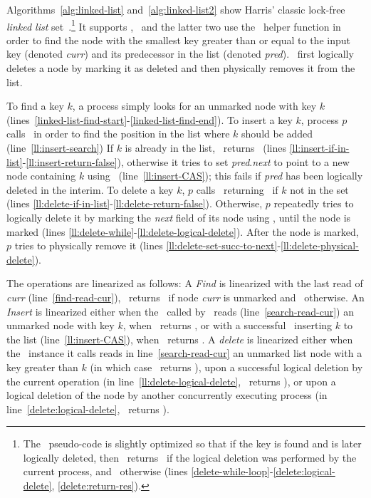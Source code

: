Algorithms~\ref{alg:linked-list} and~\ref{alg:linked-list2} show
Harris' classic lock-free \emph{linked list}
set~\cite{DBLP:conf/wdag/Harris01}.\footnote{
    The \delete\ pseudo-code is slightly optimized so that if the key is found and
    is later logically deleted, then \delete\ returns \True\ if the logical deletion
    was performed by the current process, and \False\ otherwise
    (lines \ref{delete-while-loop}-\ref{delete:logical-delete}, \ref{delete:return-res}).}
It supports \find, \insertlst\ and \delete\;
the latter two use the \search\ helper function in order to find the node with
the smallest key greater than or equal to the input key (denoted \emph{curr})
and its predecessor in the list (denoted \emph{pred}).
\delete\ first logically deletes a node by marking it
as deleted and then physically removes it from the list.



To find a key $k$, a process simply looks for an unmarked node with key $k$
(lines~\ref{linked-list-find-start}-\ref{linked-list-find-end}).
To insert a key $k$, process $p$ calls \search\ in order to find the position
in the list where $k$ should be added (line~\ref{ll:insert-search})
If $k$ is already in the list, \insertlst\ returns \False\
(lines \ref{ll:insert-if-in-list}-\ref{ll:insert-return-false}),
otherwise it tries to set \emph{pred}.\emph{next} to point to a new node
containing $k$ using \CAS\ (line~\ref{ll:insert-CAS});
this fails if \emph{pred} has been logically deleted in the interim.
To delete a key $k$, $p$ calls \search\, returning \False\ if $k$ not in the set
(lines \ref{ll:delete-if-in-list}-\ref{ll:delete-return-false}).
Otherwise, $p$ repeatedly tries to logically delete it by marking the \emph{next}
field of its node using \CAS, until the node is marked
(lines \ref{ll:delete-while}-\ref{ll:delete-logical-delete}).
After the node is marked, $p$  tries to physically remove it
(lines \ref{ll:delete-set-succ-to-next}-\ref{ll:delete-physical-delete}).

The operations are linearized as follows:
A \emph{Find} is linearized with the last read of \emph{curr}
(line~\ref{find-read-cur}), \find\ returns \True\ if node \emph{curr} is unmarked
and \False\ otherwise.
An \emph{Insert} is linearized either when the \search\ called by \insertlst\
reads (line~\ref{search-read-cur}) an unmarked node with key $k$,
when \insertlst\ returns \False,
or with a successful \CAS\ inserting $k$ to the list (line~\ref{ll:insert-CAS}),
when \insertlst\ returns \True.
A \emph{delete} is linearized either when the \search\ instance it calls
reads in line~\ref{search-read-cur} an unmarked list node with a key greater
than $k$ (in which case \delete\ returns \False),
upon a successful logical deletion by the current operation
(in line~\ref{ll:delete-logical-delete}, \delete\ returns \True),
or upon a logical deletion of the node by another concurrently executing
process (in line~\ref{delete:logical-delete}, \delete\ returns \False).


